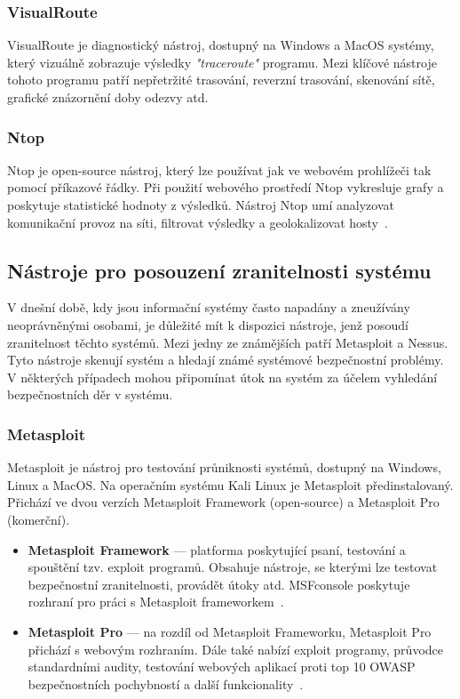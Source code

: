             \subsubsection*{VisualRoute}
                VisualRoute je diagnostický nástroj, dostupný na Windows a MacOS systémy, který vizuálně zobrazuje výsledky \textit{"traceroute"} programu. Mezi klíčové nástroje tohoto programu patří nepřetržité trasování, reverzní trasování, skenování sítě, grafické znázornění doby odezvy atd.
                
            \subsubsection*{Ntop}
                Ntop je open-source nástroj, který lze používat jak ve webovém prohlížeči tak pomocí příkazové řádky. Při použití webového prostředí Ntop vykresluje grafy a poskytuje statistické hodnoty z výsledků. Nástroj Ntop umí analyzovat komunikační provoz na síti, filtrovat výsledky a geolokalizovat hosty~\cite{FundamentalsOfNetworkForensicsReference}.
            
    
        \subsection{Nástroje pro posouzení zranitelnosti systému}
            V dnešní době, kdy jsou informační systémy často napadány a zneužívány neoprávněnými osobami, je důležité mít k dispozici nástroje, jenž posoudí zranitelnost těchto systémů. Mezi jedny ze známějších patří Metasploit a Nessus. Tyto nástroje skenují systém a hledají známé systémové bezpečnostní problémy. V některých případech mohou připomínat útok na systém za účelem vyhledání bezpečnostních děr v systému.

            \subsubsection*{Metasploit}
                Metasploit je nástroj pro testování průniknosti systémů, dostupný na Windows, Linux a MacOS. Na operačním systému Kali Linux je Metasploit předinstalovaný. Přichází ve dvou verzích Metasploit Framework (open-source) a Metasploit Pro (komerční). 
                \begin{itemize}
                    \item \textbf{Metasploit Framework} --- platforma poskytující psaní, testování a spouštění tzv. exploit programů. Obsahuje nástroje, se kterými lze testovat bezpečnostní zranitelnosti, provádět útoky atd. MSFconsole poskytuje rozhraní pro práci s Metasploit frameworkem~\cite{MetaspoiltFrameworkReference}.

                    \item \textbf{Metasploit Pro} --- na rozdíl od Metasploit Frameworku, Metasploit Pro přichází s webovým rozhraním. Dále také nabízí exploit programy, průvodce standardními audity, testování webových aplikací proti top 10 \gls{OWASP} bezpečnostních pochybností a další funkcionality~\cite{MetaspoiltProReference}. 
                \end{itemize}

